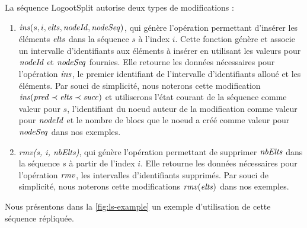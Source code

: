 La séquence LogootSplit autorise deux types de modifications :
\begin{enumerate}
  \item $\mathit{ins}(s, i, \mathit{elts}, \mathit{nodeId}, \mathit{nodeSeq})$, qui génère l'opération permettant d'insérer les éléments $\mathit{elts}$ dans la séquence $s$ à l'index $i$.
    Cette fonction génère et associe un intervalle d'identifiants aux éléments à insérer en utilisant les valeurs pour $\mathit{nodeId}$ et $\mathit{nodeSeq}$ fournies.
    Elle retourne les données nécessaires pour l'opération $\mathit{ins}$, \ie le premier identifiant de l'intervalle d'identifiants alloué et les éléments.
    Par souci de simplicité, nous noterons cette modification $\mathit{ins}(\mathit{pred} \prec \mathit{elts} \prec \mathit{succ})$ et utiliserons l'état courant de la séquence comme valeur pour $s$, l'identifiant du noeud auteur de la modification comme valeur pour $\mathit{nodeId}$ et le nombre de blocs que le noeud a créé comme valeur pour $\mathit{nodeSeq}$ dans nos exemples.
  \item  \emph{rmv(s, i, nbElts)}, qui génère l'opération permettant de supprimer $\mathit{nbElts}$ dans la séquence $s$ à partir de l'index $i$.
    Elle retourne les données nécessaires pour l'opération $\mathit{rmv}$, \ie les intervalles d'identifiants supprimés.
    Par souci de simplicité, nous noterons cette modifications $\mathit{rmv}(\mathit{elts})$ dans nos exemples.
\end{enumerate}

Nous présentons dans la \autoref{fig:ls-example} un exemple d'utilisation de cette séquence répliquée.

